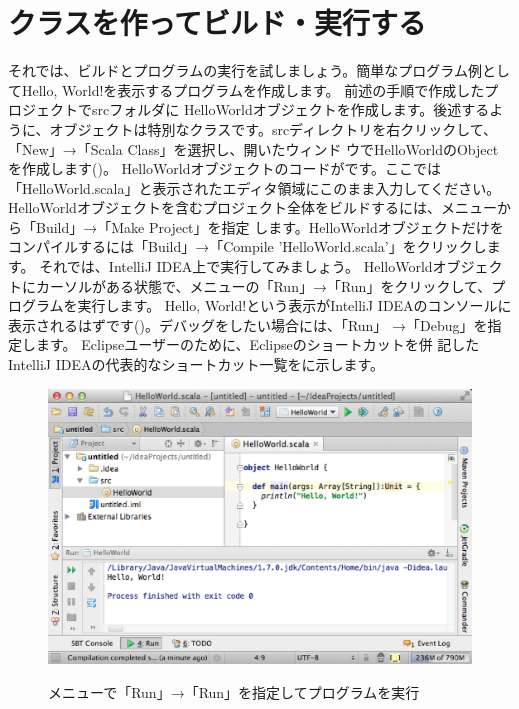 \section{クラスを作ってビルド・実行する}
それでは、ビルドとプログラムの実行を試しましょう。簡単なプログラム例としてHello, World!を表示するプログラムを作成します。 前述の手順で作成したプロジェクトでsrcフォルダに HelloWorldオブジェクトを作成します。後述するように、オブジェクトは特別なクラスです。srcディレクトリを右クリックして、「New」→「Scala Class」を選択し、開いたウィンド ウでHelloWorldのObjectを作成します()。 HelloWorldオブジェクトのコードがです。ここでは「HelloWorld.scala」と表示されたエディタ領域にこのまま入力してください。 HelloWorldオブジェクトを含むプロジェクト全体をビルドするには、メニューから「Build」→「Make Project」を指定 します。HelloWorldオブジェクトだけをコンパイルするには「Build」→「Compile 'HelloWorld.scala'」をクリックします。 それでは、IntelliJ IDEA上で実行してみましょう。 HelloWorldオブジェクトにカーソルがある状態で、メニューの「Run」→「Run」をクリックして、プログラムを実行します。 Hello, World!という表示がIntelliJ IDEAのコンソールに表示されるはずです()。デバッグをしたい場合には、「Run」 →「Debug」を指定します。 Eclipseユーザーのために、Eclipseのショートカットを併 記したIntelliJ IDEAの代表的なショートカット一覧をに示します。

\begin{figure}[h]
  \centering
  \caption{メニューで「Run」→「Run」を指定してプログラムを実行}
  \includegraphics[scale=0.4]{img/intellij.eps}
  \label{fig:intellij}
\end{figure}

